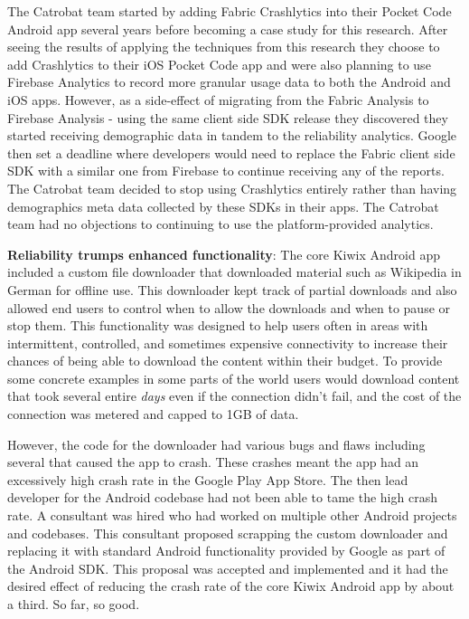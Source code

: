 The Catrobat team started by adding Fabric Crashlytics into their Pocket Code Android app several years before becoming a case study for this research. After seeing the results of applying the techniques from this research they choose to add Crashlytics to their iOS Pocket Code app and were also planning to use Firebase Analytics to record more granular usage data to both the Android and iOS apps. However, as a side-effect of migrating from the Fabric Analysis to Firebase Analysis - using the same client side SDK release they discovered they started receiving demographic data in tandem to the reliability analytics. Google then set a deadline where developers would need to replace the Fabric client side SDK with a similar one from Firebase to continue receiving any of the reports. The Catrobat team decided to stop using Crashlytics entirely rather than having demographics meta data collected by these SDKs in their apps. The Catrobat team had no objections to continuing to use the platform-provided analytics.


\textbf{Reliability trumps enhanced functionality}: 
The core Kiwix Android app included a custom file downloader that downloaded material such as Wikipedia in German for offline use. This downloader kept track of partial downloads and also allowed end users to control when to allow the downloads and when to pause or stop them. This functionality was designed to help users often in areas with intermittent, controlled, and sometimes expensive connectivity to increase their chances of being able to download the content within their budget. To provide some concrete examples in some parts of the world users would download content that took several entire \emph{days} even if the connection didn't fail, and the cost of the connection was metered and capped to 1GB of data.

However, the code for the downloader had various bugs and flaws including several that caused the app to crash. These crashes meant the app had an excessively high crash rate in the Google Play App Store. The then lead developer for the Android codebase had not been able to tame the high crash rate. A consultant was hired who had worked on multiple other Android projects and codebases. This consultant proposed scrapping the custom downloader and replacing it with standard Android functionality provided by Google as part of the Android SDK. This proposal was accepted and implemented and it had the desired effect of reducing the crash rate of the core Kiwix Android app by about a third. So far, so good.

